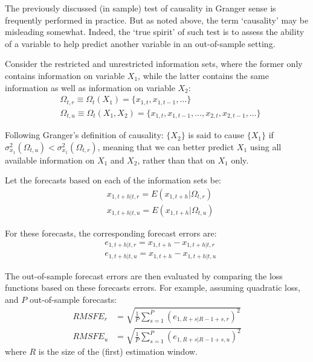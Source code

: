 \documentclass[
  12pt,
  oneside]{book}
\begin{document}
The previously discussed (in sample) test of causality in Granger sense is frequently performed in practice. But as noted above, the term `causality' may be misleading somewhat. Indeed, the `true spirit' of such test is to assess the ability of a variable to help predict another variable in an out-of-sample setting.

Consider the restricted and unrestricted information sets, where the former only contains information on variable \(X_1\), while the latter contains the same information as well as information on variable \(X_2\):
\[\begin{aligned}
&\Omega_{t,r} \equiv \Omega_{t}(X_1) = \{x_{1,t},x_{1,t-1},\ldots\} \\
&\Omega_{t,u} \equiv \Omega_{t}(X_1,X_2) = \{x_{1,t},x_{1,t-1},\ldots,x_{2,t},x_{2,t-1},\ldots\}
\end{aligned}\]

Following Granger's definition of causality: \(\{X_2\}\) is said to cause \(\{X_1\}\) if \(\sigma_{x_1}^2\left(\Omega_{t,u}\right) < \sigma_{x_1}^2\left(\Omega_{t,r}\right)\), meaning that we can better predict \(X_1\) using all available information on \(X_1\) and \(X_2\), rather than that on \(X_1\) only.

Let the forecasts based on each of the information sets be:
\[\begin{aligned}
    &x_{1,t+h|t,r} = E\left(x_{1,t+h}|\Omega_{t,r}\right) \\
    &x_{1,t+h|t,u} = E\left(x_{1,t+h}|\Omega_{t,u}\right)
\end{aligned}\]

For these forecasts, the corresponding forecast errors are:
\[\begin{aligned}
    & e_{1,t+h|t,r} = x_{1,t+h} - x_{1,t+h|t,r}\\
    & e_{1,t+h|t,u} = x_{1,t+h} - x_{1,t+h|t,u}
\end{aligned}\]

The out-of-sample forecast errors are then evaluated by comparing the loss functions based on these forecasts errors. For example, assuming quadratic loss, and \(P\) out-of-sample forecasts:
\[\begin{aligned}
RMSFE_{r} &= \sqrt{\frac{1}{P}\sum_{s=1}^{P}\left(e_{1,R+s|R-1+s,r}\right)^2} \\
RMSFE_{u} &= \sqrt{\frac{1}{P}\sum_{s=1}^{P}\left(e_{1,R+s|R-1+s,u}\right)^2}
\end{aligned}\]
where \(R\) is the size of the (first) estimation window.
\end{document}
